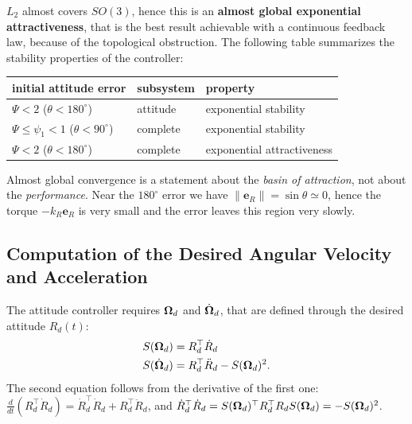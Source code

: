 \documentclass[10pt, a4paper]{report}
\begin{document}
$L_2$ almost covers $SO(3)$, hence this is an \textbf{almost global exponential attractiveness}, that is the best result achievable with a continuous feedback law, because of the topological obstruction. The following table summarizes the stability properties of the controller:
\begin{table}[htbp]
    \centering
    \renewcommand{\arraystretch}{1.6}
    \begin{tabular}{lll}
        \toprule
        \textsf{\textbf{initial attitude error}} & \textsf{\textbf{subsystem}} & \textsf{\textbf{property}} \\
        \midrule
        $\Psi<2$ ($\theta<180^\circ$) & attitude & exponential stability \\
        $\Psi\le\psi_1<1$ ($\theta<90^\circ$) & complete & exponential stability \\
        $\Psi<2$ ($\theta<180^\circ$) & complete & exponential attractiveness \\
        \bottomrule
    \end{tabular}
\end{table}
\begin{boxobservation}{}{}
Almost global convergence is a statement about the \textit{basin of attraction}, not about the \textit{performance}. Near the $180^\circ$ error we have $\|\mathbf e_R\|=\sin\theta\simeq0$, hence the torque $-k_R\mathbf e_R$ is very small and the error leaves this region very slowly.
\end{boxobservation}
\subsection{Computation of the Desired Angular Velocity and Acceleration}
The attitude controller requires ${\boldsymbol{\Omega}}_d$ and $\dot{{\boldsymbol{\Omega}}}_d$, that are defined through the desired attitude $R_d(t)$:\begin{align}
    S({\boldsymbol{\Omega}}_d)&=R_d^\top\dot R_d\\
    S(\dot{{\boldsymbol{\Omega}}}_d)&=R_d^\top\ddot R_d-S({\boldsymbol{\Omega}}_d)^2.
\end{align}
The second equation follows from the derivative of the first one: $\frac{d}{dt}(R_d^\top\dot R_d)=\dot R_d^\top\dot R_d+R_d^\top\ddot R_d$, and $\dot R_d^\top\dot R_d=S({\boldsymbol{\Omega}}_d)^\top R_d^\top R_dS({\boldsymbol{\Omega}}_d)=-S({\boldsymbol{\Omega}}_d)^2$.\bigskip
\end{document}
